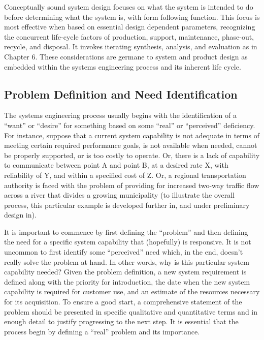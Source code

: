 Conceptually sound system design focuses on what the system is intended to do before determining what the system is, with form following function. This focus is most effective when based on essential design dependent parameters, recognizing the concurrent life-cycle factors of production, support, maintenance, phase-out, recycle, and disposal. It invokes iterating synthesis, analysis, and evaluation as in Chapter 6. These considerations are germane to system and product design as embedded within the systems engineering process and its inherent life cycle.

\subsection{Problem Definition and Need Identification}

The systems engineering process usually begins with the identification of a ``want'' or ``desire'' for something based on some ``real'' or ``perceived'' deficiency. For instance, suppose that a current system capability is not adequate in terms of meeting certain required performance goals, is not available when needed, cannot be properly supported, or is too costly to operate. Or, there is a lack of capability to communicate between point A and point B, at a desired rate X, with reliability of Y, and within a specified cost of Z. Or, a regional transportation authority is faced with the problem of providing for increased two-way traffic flow across a river that divides a growing municipality (to illustrate the overall process, this particular example is developed further in, and under preliminary design in).

It is important to commence by first defining the ``problem'' and then defining the need for a specific system capability that (hopefully) is responsive. It is not uncommon to first identify some ``perceived'' need which, in the end, doesn’t really solve the problem at hand. In other words, why is this particular system capability needed? Given the problem definition, a new system requirement is defined along with the priority for introduction, the date when the new system capability is required for customer use, and an estimate of the resources necessary for its acquisition. To ensure a good start, a comprehensive statement of the problem should be presented in specific qualitative and quantitative terms and in enough detail to justify progressing to the next step. It is essential that the process begin by defining a ``real'' problem and its importance.

